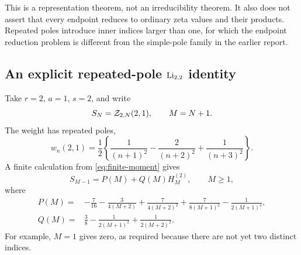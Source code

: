 This is a representation theorem, not an irreducibility theorem. It
also does not assert that every endpoint reduces to ordinary zeta values
and their products. Repeated poles introduce inner indices larger than
one, for which the endpoint reduction problem is different from the
simple-pole family in the earlier report.

\subsection{An explicit repeated-pole \texorpdfstring{$\operatorname{Li}_{2,2}$}{Li(2,2)} identity}
Take $r=2$, $a=1$, $s=2$, and write
\[
 S_N=\mathcal Z_{2,N}(2,1),\qquad M=N+1.
\]
The weight has repeated poles,
\[
 w_n(2,1)=\frac12\left\{\frac1{(n+1)^2}
                    -\frac2{(n+2)^2}+\frac1{(n+3)^2}\right\}.
\]
A finite calculation from \eqref{eq:finite-moment} gives
\begin{equation}\label{eq:cutoff-PQ}
 S_{M-1}=P(M)+Q(M)H_M^{(2)},\qquad M\ge1,
\end{equation}
where
\begin{align}
 P(M)={}&-\frac7{16}-\frac3{4(M+2)}+\frac7{4(M+2)^2}
                   +\frac7{8(M+1)^2}-\frac1{2(M+1)^4},\label{eq:Pexplicit}\\
 Q(M)={}&\frac38-\frac1{2(M+1)^2}+\frac1{2(M+2)^2}.
 \label{eq:Qexplicit}
\end{align}
For example, $M=1$ gives zero, as required because there are not yet
two distinct indices.

